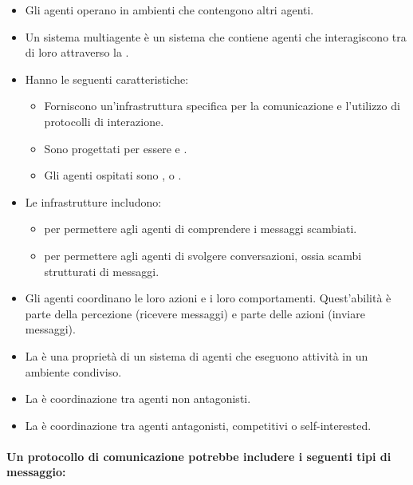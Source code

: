 

\begin{itemize}
  \item Gli agenti operano in ambienti che contengono altri agenti.
  \item Un sistema multiagente è un sistema che contiene agenti che interagiscono tra di loro attraverso la . 
  \item Hanno le seguenti caratteristiche:
    \begin{itemize}
      \item Forniscono un'infrastruttura specifica per la comunicazione e l'utilizzo di protocolli di interazione. 
      \item Sono progettati per essere  e . 
      \item Gli agenti ospitati sono ,  o .
    \end{itemize}
  \item Le infrastrutture includono:
    \begin{itemize}
      \item {} per permettere agli agenti di comprendere i messaggi scambiati. 
      \item {} per permettere agli agenti di svolgere conversazioni, ossia scambi strutturati di messaggi. 
    \end{itemize}
  \item Gli agenti coordinano le loro azioni e i loro comportamenti. Quest'abilità è parte della percezione (ricevere messaggi) e parte delle azioni (inviare messaggi). 
  \item La  è una proprietà di un sistema di agenti che eseguono attività in un ambiente condiviso. 
  \item La  è coordinazione tra agenti non antagonisti. 
  \item La  è coordinazione tra agenti antagonisti, competitivi o self-interested.
\end{itemize}

\paragraph{Un protocollo di comunicazione potrebbe includere i seguenti tipi di messaggio:}

